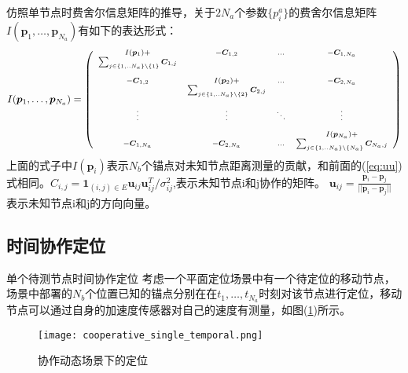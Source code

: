 仿照单节点时费舍尔信息矩阵的推导，关于$2N_a$个参数$\{p_i^a\}$的费舍尔信息矩阵$I(\bm{p}_1,\dots,\bm{p}_{N_a})$有如下的表达形式：
\begin{equation}
\scriptsize{
I(\bm{p}_1,\dots,\bm{p}_{N_a})=
\left(
\begin{array}{cccc}
I(\bm{p}_1)+&-\bm{C}_{1,2}&...&-\bm{C}_{1,N_a}\\
\sum_{j\in \{1,..N_a\}\backslash\{1\}}\bm{C}_{1,j}&&&\\
&&&\\
-\bm{C}_{1,2} & I(\bm{p}_2)+
&...&-\bm{C}_{2,N_a}\\
&\sum_{j\in \{1,..N_a\}\backslash \{2\}}\bm{C}_{2,j}&&\\
&&&\\
\vdots &\vdots&\ddots &\vdots\\
&&&\\
&&&I(\bm{p}_{N_a})+\\
-\bm{C}_{1,N_a}&-\bm{C}_{2,N_a}&...& \sum_{j\in \{1,..N_a\}\backslash\{N_a\}}\bm{C}_{N_a,j}\\
\end{array}
\right)
}
\end{equation}
上面的式子中$I(\bm{p}_i)$表示$N_b$个锚点对未知节点距离测量的贡献，和前面的(\ref{eq:uu})式相同。$C_{i,j}=\bm{1}_{(i,j)\in E}\bm{u}_{ij}\bm{u}_{ij}^T/\sigma^2_{ij}$,表示未知节点i和j协作的矩阵。
$\bm{u}_{ij}=\frac{\bm{p}_i-\bm{p}_j}{||\bm{p}_i-\bm{p}_j||}$表示未知节点i和j的方向向量。
\subsection[时间协作定位]{时间协作定位}\label{subsection:temporal_cooperative_localization}

{单个待测节点时间协作定位}
考虑一个平面定位场景中有一个待定位的移动节点，场景中部署的$N_b$个位置已知的锚点分别在在$t_1,\dots,t_{N_a}$时刻对该节点进行定位，移动节点可以通过自身的加速度传感器对自己的速度有测量，如图(\ref{fig:cooperative_single_temporal})所示。
        \begin{figure}
          \centering
          \texttt{[image: cooperative\_single\_temporal.png]}
          \caption{协作动态场景下的定位}\label{fig:cooperative_single_temporal}
        \end{figure}

